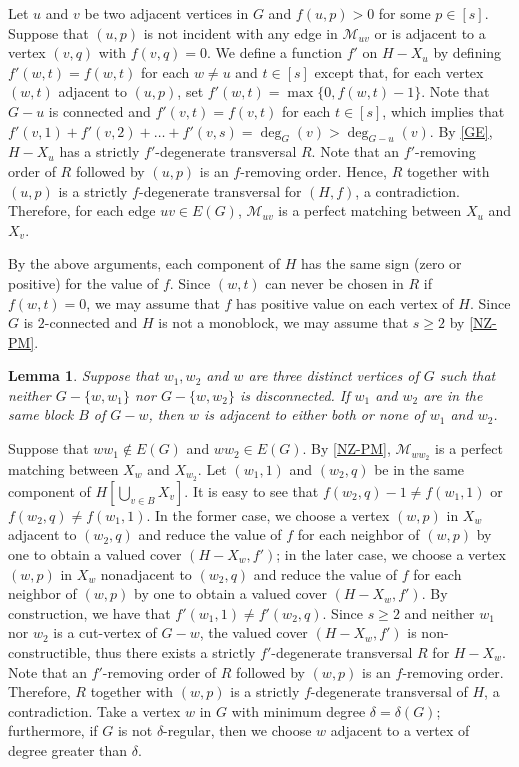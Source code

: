 \documentclass{article}
\makeatletter
\renewenvironment{proof}[1][\proofname]{\par
  \pushQED{\qed}%
  \normalfont \topsep6\p@\@plus6\p@\relax
  \trivlist
  \item[\hskip\labelsep
        \bfseries
    #1\@addpunct{.}]\ignorespaces
}{%
  \popQED\endtrivlist\@endpefalse
}
\newtheorem{lemma}[theorem]{Lemma}
\theoremstyle{definition}
\makeatother
\begin{document}
\begin{proof}[Proof of \autoref{MR}]
\begin{proof}
Let $u$ and $v$ be two adjacent vertices in $G$ and $f(u, p) > 0$ for some $p \in [s]$. Suppose that $(u, p)$ is not incident with any edge in $\mathscr{M}_{uv}$ or is adjacent to a vertex $(v, q)$ with $f(v, q) = 0$. We define a function $f'$ on $H - X_{u}$ by defining $f'(w, t) = f(w, t)$ for each $w \neq u$ and $t \in [s]$ except that, for each vertex $(w, t)$ adjacent to $(u, p)$, set $f'(w, t) = \max\{0, f(w, t) - 1\}$. Note that $G - u$ is connected and $f'(v, t) = f(v, t)$ for each $t \in [s]$, which implies that $f'(v, 1) + f'(v, 2) + \dots + f'(v, s) = \deg_{G}(v) > \deg_{G-u}(v)$. By \autoref{GE}, $H - X_{u}$ has a strictly $f'$-degenerate transversal $R$. Note that an $f'$-removing order of $R$ followed by $(u, p)$ is an $f$-removing order. Hence, $R$ together with $(u, p)$ is a strictly $f$-degenerate transversal for $(H, f)$, a contradiction. Therefore, for each edge $uv \in E(G)$, $\mathscr{M}_{uv}$ is a perfect matching between $X_{u}$ and $X_{v}$. 

By the above arguments, each component of $H$ has the same sign (zero or positive) for the value of $f$. Since $(w, t)$ can never be chosen in $R$ if $f(w, t) = 0$, we may assume that $f$ has positive value on each vertex of $H$.
\end{proof}
Since $G$ is $2$-connected and $H$ is not a monoblock, we may assume that $s \geq 2$ by \autoref{NZ-PM}. 
\begin{lemma}\label{COM}
Suppose that $w_{1}, w_{2}$ and $w$ are three distinct vertices of $G$ such that neither $G - \{w, w_{1}\}$ nor $G - \{w, w_{2}\}$ is disconnected. If $w_{1}$ and $w_{2}$ are in the same block $B$ of $G - w$, then $w$ is adjacent to either both or none of $w_{1}$ and $w_{2}$. 
\end{lemma}
\begin{proof}
Suppose that $ww_{1} \notin E(G)$ and $ww_{2} \in E(G)$. By \autoref{NZ-PM}, $\mathscr{M}_{ww_{2}}$ is a perfect matching between $X_{w}$ and $X_{w_{2}}$. Let $(w_{1}, 1)$ and $(w_{2}, q)$ be in the same component of $H[\bigcup_{v \in B}X_{v}]$. It is easy to see that $f(w_{2}, q) - 1 \neq f(w_{1}, 1)$ or $f(w_{2}, q) \neq f(w_{1}, 1)$. In the former case, we choose a vertex $(w, p)$ in $X_{w}$ adjacent to $(w_{2}, q)$ and reduce the value of $f$ for each neighbor of $(w, p)$ by one to obtain a valued cover $(H - X_{w}, f')$; in the later case, we choose a vertex $(w, p)$ in $X_{w}$ nonadjacent to $(w_{2}, q)$ and reduce the value of $f$ for each neighbor of $(w, p)$ by one to obtain a valued cover $(H - X_{w}, f')$. By construction, we have that $f'(w_{1}, 1) \neq f'(w_{2}, q)$. Since $s \geq 2$ and neither $w_{1}$ nor $w_{2}$ is a cut-vertex of $G - w$, the valued cover $(H - X_{w}, f')$ is non-constructible, thus there exists a strictly $f'$-degenerate transversal $R$ for $H - X_{w}$. Note that an $f'$-removing order of $R$ followed by $(w, p)$ is an $f$-removing order. Therefore, $R$ together with $(w, p)$ is a strictly $f$-degenerate transversal of $H$, a contradiction. 
\end{proof}
Take a vertex $w$ in $G$ with minimum degree $\delta = \delta(G)$; furthermore, if $G$ is not $\delta$-regular, then we choose $w$ adjacent to a vertex of degree greater than $\delta$. 


\end{proof}
\end{document}
